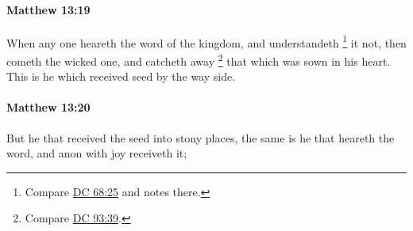 		\paragraph{Matthew 13:19} %
			\label{MATTHEW-13-19}

			When any one heareth the word of the kingdom, and understandeth%
				\footnote{%
					Compare \hyperref[DC68-25]{DC 68:25} and notes there.
					}
			it not, then cometh the wicked one, and catcheth away%
				\footnote{%
					Compare \hyperref[DC93-39]{DC 93:39}.
					}
			that which was sown in his heart. This is he which received seed by the way side.

			\begin{framed}
			\scriptsize
				\begin{compactdesc}
					\item[SBLG] 
				\end{compactdesc}
			\end{framed}

		\paragraph{Matthew 13:20} %
			\label{MATTHEW-13-20}

			But he that received the seed into stony places, the same is he that heareth the word, and anon with joy receiveth it;

